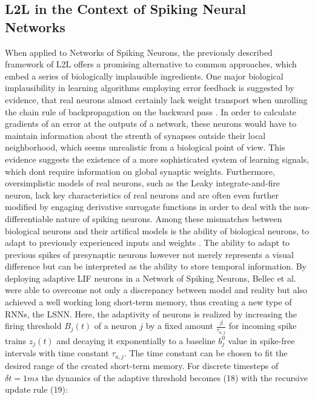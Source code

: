 \documentclass[letterpaper, 10 pt, conference]{ieeeconf}  %
\begin{document}
\subsection{L2L in the Context of Spiking Neural Networks}
When applied to Networks of Spiking Neurons, the previously described framework of L2L offers a promising alternative
to common approaches, which embed a series of biologically implausible ingredients. One major biological implausibility
in learning algorithms employing error feedback is suggested by evidence, that real neurons almost certainly lack weight transport
when unrolling the chain rule of backpropagation on the backward pass\cite{samadiDeepLearningDynamic2017}
\cite{chintaAdaptiveOptimalControl2012}\cite{crickRecentExcitementNeural1989}. In order 
to calculate gradients
of an error at the outputs of a network, these neurons would have to maintain information about the strenth of synapses outside their local
neighborhood, which seems unrealistic from a biological point of view. This evidence suggests the existence of a more sophisticated 
system of learning signals, which dont require information on global synaptic weights. Furthermore, oversimplistic models of real
neurons, such as the Leaky integrate-and-fire neuron, lack key characteristics of real neurons and are often even further modified by engaging
derivative surrogate functions in order to deal with the non-differentiable nature of spiking neurons. Among these mismatches between 
biological neurons and their artifical models is the ability of biological neurons, to adapt to previously experienced inputs
and weights \cite{samadiDeepLearningDynamic2017}. The ability to adapt to previous spikes of presynaptic neurons however not merely represents a visual
difference but can be interpreted as the ability to store temporal information. \newline
By deploying adaptive LIF neurons in a Network of Spiking Neurons, Bellec et al.\cite{bellecLongShorttermMemory2018} were able to overcome not only a 
discrepancy between model and reality but also achieved a well working long short-term memory, thus creating a new type of RNNs, the LSNN. 
Here, the adaptivity of neurons is realized by increasing the firing threshold $B_j(t)$ of a neuron $j$
by a fixed amount $\frac{\beta}{\tau_{a,j}}$ for incoming spike trains $z_j(t)$ and decaying it exponentially to a baseline $b^0_j$ value in spike-free intervals 
with time constant $\tau_{a,j}$. The time constant can be chosen to fit the desired range of the created short-term memory. For discrete timesteps
of $\delta t = 1 ms$ the dynamics of the adaptive threshold becomes (18) with the recursive update rule (19):
\end{document}
